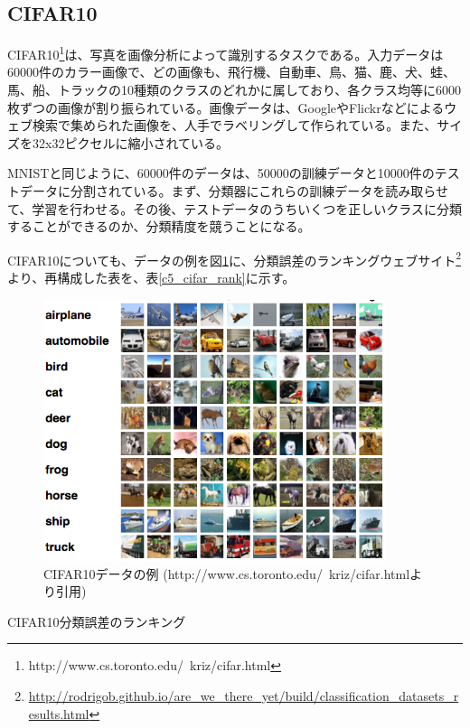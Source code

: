 \subsection{CIFAR10}
CIFAR10\footnote{http://www.cs.toronto.edu/~kriz/cifar.html}は、写真を画像分析によって識別するタスクである\cite{krizhevsky2009learning}。入力データは60000件のカラー画像で、どの画像も、飛行機、自動車、鳥、猫、鹿、犬、蛙、馬、船、トラックの10種類のクラスのどれかに属しており、各クラス均等に6000枚ずつの画像が割り振られている。画像データは、GoogleやFlickrなどによるウェブ検索で集められた画像を、人手でラベリングして作られている。また、サイズを32x32ピクセルに縮小されている。\par
MNISTと同じように、60000件のデータは、50000の訓練データと10000件のテストデータに分割されている。まず、分類器にこれらの訓練データを読み取らせて、学習を行わせる。その後、テストデータのうちいくつを正しいクラスに分類することができるのか、分類精度を競うことになる。\par
CIFAR10についても、データの例を図\ref{c5_cifar_ex}に、分類誤差のランキングウェブサイト\footnote{\url{http://rodrigob.github.io/are_we_there_yet/build/classification_datasets_results.html}}より、再構成した表を、表\ref{c5_cifar_rank}に示す。
\begin{figure}[tbp]
 \begin{center}
  \includegraphics[width=100mm]{img/c5/cifar_ex}
 \end{center}
 \caption{CIFAR10データの例 (http://www.cs.toronto.edu/~kriz/cifar.htmlより引用)}
 \label{c5_cifar_ex}
\end{figure}


\begin{table}[tbp]
 \begin{center}
  \caption{CIFAR10分類誤差のランキング}
 
 \end{center}

 \label{c5_cifar_rank}
\end{table}

